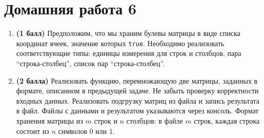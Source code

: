 \section{Домашняя работа 6}

\begin{enumerate}
    \item \textbf{(1 балл)} Предположим, что мы храним булевы матрицы в виде списка координат ячеек, значение которых \texttt{true}. Необходимо реализовать соответствующие типы: единицы измерения для строк и столбцов, пара ``строка-столбец'', список пар ``строка-столбец''. 
    \item \textbf{(2 балла)} Реализовать функцию, перемножающую две матрицы, заданных в формате, описанном в предыдущей задаче. Не забыть проверку корректности входных данных. Реализовать подгрузку матриц из файла и запись результата в файл. Файлы с данными и результатом указываются через консоль. Формат хранения матрицы из $m$ строк и $n$ столбцов: в файле $m$ строк, каждая строка состоит из $n$ символов 0 или 1.
\end{enumerate} 
